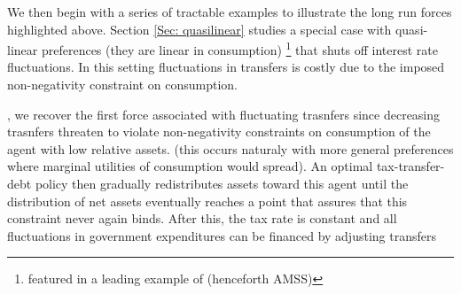 \documentclass[thmsb,11pt]{article}
\begin{document}
We then begin with a series of tractable examples to illustrate the long run forces highlighted above. Section \ref{Sec: quasilinear}
studies a special case with quasi-linear preferences  (they are linear in consumption) \footnote{featured in a leading example of \citet{Aiyagari2002} (henceforth AMSS)} that shuts off interest rate fluctuations. In this setting fluctuations in transfers is costly due to the imposed non-negativity constraint on consumption. 	

, we recover the first force associated with fluctuating trasnfers since decreasing trasnfers threaten to violate non-negativity constraints on consumption of the  agent with low relative assets. (this occurs naturaly with more general preferences where marginal utilities of consumption would spread). An optimal tax-transfer-debt policy then gradually redistributes assets toward  this agent until the distribution of net assets eventually reaches  a point that assures that this constraint never  again binds. After this, the tax rate is constant and all fluctuations in government expenditures can be financed by adjusting transfers
\end{document}
